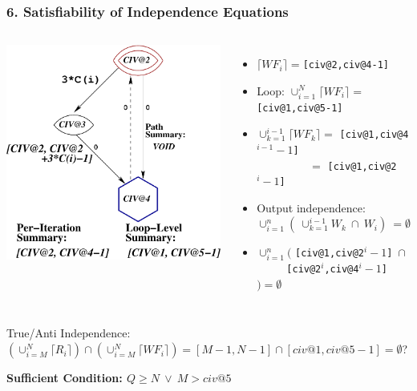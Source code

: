 \documentclass{beamer}
\newcommand{\emp}[1]{\textcolor{DikuRed}{ #1}}
\newcommand{\emphh}[1]{\textcolor{CosGreen}{ #1}}
\begin{document}
\begin{frame}[fragile,t]
\frametitle{6. Satisfiability of Independence Equations}

\begin{columns}
\includegraphics[height=30ex]{Figures/VEG_CORREC.pdf}
\begin{itemize}
    \item[1] $\lceil WF_i \rceil = ${\tt [civ@2,civ@4-1]}
    \item[2] Loop: $\cup_{i=1}^{N} \lceil WF_i \rceil = $ \emphh{\tt{}[civ@1,civ@5-1]}
    \item[3] $\cup_{k=1}^{i-1} \lceil WF_k \rceil = $ \emphh{\tt{}[civ@1,civ@4$^{i-1}-1$]}\\
             $\mbox{~~~~~~~~~~~~~~}=$ \emphh{\tt{}[civ@1,civ@2$^{i}-1$]}\bigskip
    \item[4] Output independence: $\cup_{i=1}^{n}(\ \cup_{k=1}^{i-1}W_k \ \cap \ W_i ) \ = \emptyset$\smallskip\pause
    \item $\cup_{i=1}^{n}($ {\tt[civ@1,civ@2$^{i}-1$] $\cap$}\\
          $\mbox{~~~~~~~~}${\tt[civ@2$^{i}$,civ@4$^{i}-1$]$) = \emptyset$}\bigskip
\end{itemize}
\end{columns}
\bigskip
\pause

\emp{True/Anti Independence:\\
$(\cup_{i=M}^N \lceil R_i \rceil) \cap (\cup_{i=M}^N \lceil WF_i\rceil) = [M-1,N-1] \cap [civ@1, civ@5-1] = \emptyset$?}\\\medskip

\emphh{\bf Sufficient Condition:
$Q \geq N \ \vee \ M > civ@5$}

\end{frame}
\end{document}
